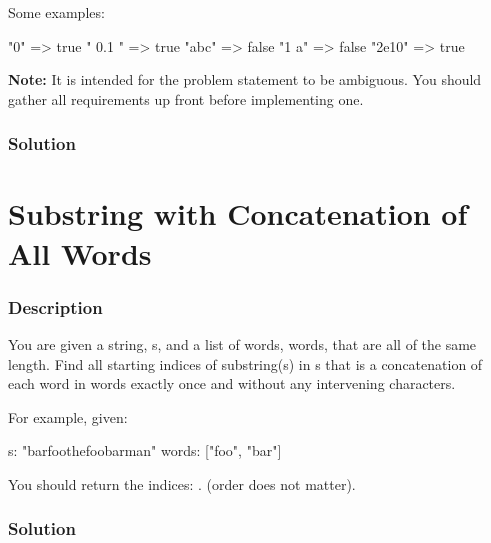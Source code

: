 Some examples:
\begin{Code}
"0" => true
" 0.1 " => true
"abc" => false
"1 a" => false
"2e10" => true
\end{Code}

\textbf{Note:} It is intended for the problem statement to be ambiguous. You should gather all requirements up front before implementing one.

\subsubsection{Solution}

\begin{Code}

\end{Code}

\newpage

\section{Substring with Concatenation of All Words} %

\subsubsection{Description}
You are given a string, s, and a list of words, words, that are all of the same length. Find all starting indices of substring(s) in s that is a concatenation of each word in words exactly once and without any intervening characters.

For example, given:
\begin{Code}
s: "barfoothefoobarman"
words: ["foo", "bar"]
\end{Code}

You should return the indices: \code{[0,9]}.
(order does not matter).

\subsubsection{Solution}

